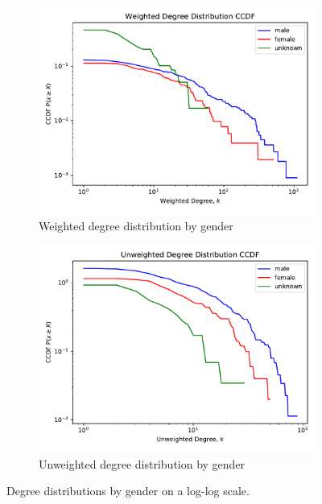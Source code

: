 \begin{figure}[ht]
    \centering
    \begin{subfigure}{0.4\textwidth}
        \includegraphics[width=1.\textwidth]{images/degree_distr_ccdf_gender_weighted-Weighted.pdf}
        \caption{Weighted degree distribution by gender}
    \end{subfigure}
    \begin{subfigure}{0.4\textwidth}
        \includegraphics[width=1.\textwidth]{images/degree_distr_ccdf_gender_weighted-Unweighted.pdf}
        \caption{Unweighted degree distribution by gender}
    \end{subfigure}
    \caption{Degree distributions by gender on a log-log scale.}
    \label{fig:degree_distr}
\end{figure}

